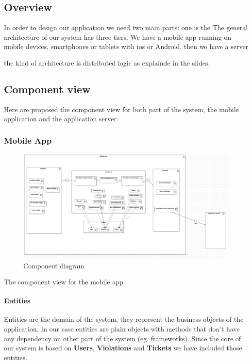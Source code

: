 \subsection{Overview}

In order to design our application we need two main parts: one is the
The general architecture of our system has three tiers.
We have a mobile app running on mobile devices, smartphones or tablets with ios or Android.
then we have a server

the kind of architecture is distributed logic as explainde in the slides.


\subsection{Component view}

Here are proposed the component view for both part of the system, the mobile application and the application server.


\subsubsection{Mobile App}
\begin{figure}
\centering
\includegraphics[width=\textwidth]{Images/ComponentDiagram1.png}
\caption{\label{fig:compdiag} Component diagram}
\end{figure}

The component view for the mobile app

\paragraph{Entities}
Entities are the domain of the system, they represent the business objects of the application. In our case entities are plain objects with methods that don't have any dependency on other part of the system (eg. frameworks).
Since the core of our system is based on \textbf{Users}, \textbf{Violations} and \textbf{Tickets} we have included those entities.


